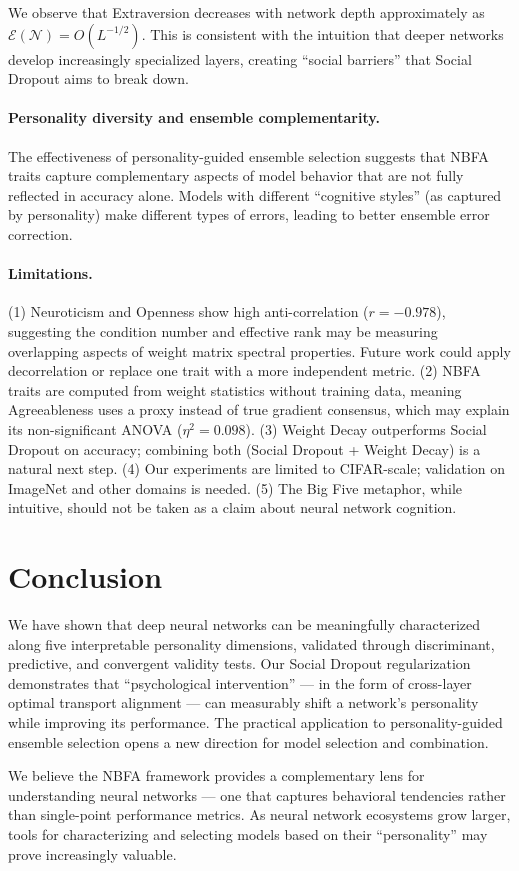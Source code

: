 \documentclass[letterpaper]{article}
\begin{document}
We observe that Extraversion decreases with network depth approximately as $\mathcal{E}(\mathcal{N}) = O(L^{-1/2})$. This is consistent with the intuition that deeper networks develop increasingly specialized layers, creating ``social barriers'' that Social Dropout aims to break down.

\paragraph{Personality diversity and ensemble complementarity.}
The effectiveness of personality-guided ensemble selection suggests that NBFA traits capture complementary aspects of model behavior that are not fully reflected in accuracy alone. Models with different ``cognitive styles'' (as captured by personality) make different types of errors, leading to better ensemble error correction.

\paragraph{Limitations.}
(1) Neuroticism and Openness show high anti-correlation ($r=-0.978$), suggesting the condition number and effective rank may be measuring overlapping aspects of weight matrix spectral properties. Future work could apply decorrelation or replace one trait with a more independent metric. (2) NBFA traits are computed from weight statistics without training data, meaning Agreeableness uses a proxy instead of true gradient consensus, which may explain its non-significant ANOVA ($\eta^2=0.098$). (3) Weight Decay outperforms Social Dropout on accuracy; combining both (Social Dropout + Weight Decay) is a natural next step. (4) Our experiments are limited to CIFAR-scale; validation on ImageNet and other domains is needed. (5) The Big Five metaphor, while intuitive, should not be taken as a claim about neural network cognition.

\section{Conclusion}
\label{sec:conclusion}

We have shown that deep neural networks can be meaningfully characterized along five interpretable personality dimensions, validated through discriminant, predictive, and convergent validity tests. Our Social Dropout regularization demonstrates that ``psychological intervention'' — in the form of cross-layer optimal transport alignment — can measurably shift a network's personality while improving its performance. The practical application to personality-guided ensemble selection opens a new direction for model selection and combination.

We believe the NBFA framework provides a complementary lens for understanding neural networks — one that captures behavioral tendencies rather than single-point performance metrics. As neural network ecosystems grow larger, tools for characterizing and selecting models based on their ``personality'' may prove increasingly valuable.


\end{document}
